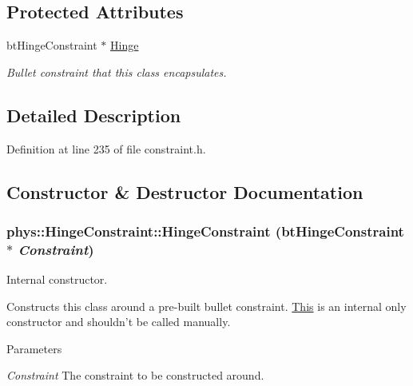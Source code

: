\subsection*{Protected Attributes}
\begin{DoxyCompactItemize}
\item 
\hypertarget{classphys_1_1HingeConstraint_afa4e4f1595d6420f21449d5e3b730f49}{
btHingeConstraint $\ast$ \hyperlink{classphys_1_1HingeConstraint_afa4e4f1595d6420f21449d5e3b730f49}{Hinge}}
\label{d3/d0d/classphys_1_1HingeConstraint_afa4e4f1595d6420f21449d5e3b730f49}

\begin{DoxyCompactList}\small\item\em Bullet constraint that this class encapsulates. \item\end{DoxyCompactList}\end{DoxyCompactItemize}


\subsection{Detailed Description}


Definition at line 235 of file constraint.h.



\subsection{Constructor \& Destructor Documentation}
\hypertarget{classphys_1_1HingeConstraint_ab326e7128413aa3b737b726b3513c8df}{
\subsubsection[{HingeConstraint}]{\setlength{\rightskip}{0pt plus 5cm}phys::HingeConstraint::HingeConstraint (btHingeConstraint $\ast$ {\em Constraint})}}
\label{d3/d0d/classphys_1_1HingeConstraint_ab326e7128413aa3b737b726b3513c8df}


Internal constructor. 

Constructs this class around a pre-\/built bullet constraint. \hyperlink{structThis}{This} is an internal only constructor and shouldn't be called manually. 
\begin{DoxyParams}{Parameters}
\item[{\em Constraint}]The constraint to be constructed around. \end{DoxyParams}


